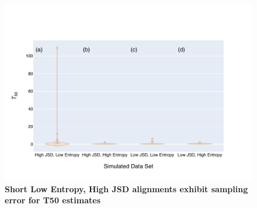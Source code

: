 \begin{figure}[!ht]
\centering
\includegraphics[width=\textwidth]{figures/plots/synthetic/T50/300bp.pdf}
\caption{\textbf{Short Low Entropy, High JSD alignments exhibit sampling error for T50 estimates }}
\label{fig:t50_long}
\end{figure}